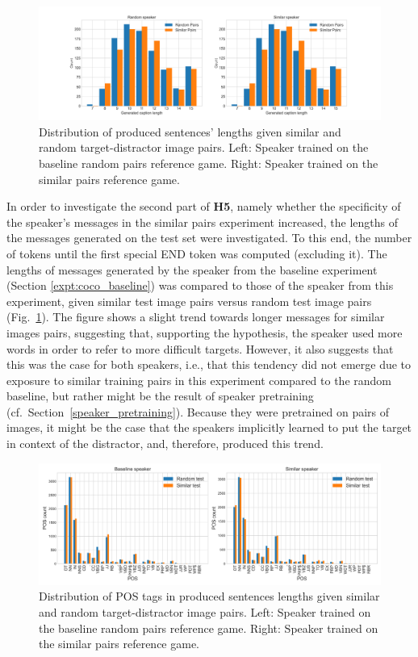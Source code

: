 \begin{figure}[h]
	\centering
	\includegraphics[width=\linewidth]{images/coco_random_similar_length_counts.png}
	\caption{Distribution of produced sentences' lengths given similar and random target-distractor image pairs. Left: Speaker trained on the baseline random pairs reference game. Right: Speaker trained on the similar pairs reference game.}
	\label{fig:coco_similar_random_speaker_lengths}
\end{figure}
In order to investigate the second part of \textbf{H5}, namely whether the specificity of the speaker's messages in the similar pairs experiment increased, the lengths of the messages generated on the test set were investigated. To this end, the number of tokens until the first special END token was computed (excluding it). The lengths of messages generated by the speaker from the baseline experiment (Section \ref{expt:coco_baseline}) was compared to those of the speaker from this experiment, given similar test image pairs versus random test image pairs (Fig.~\ref{fig:coco_similar_random_speaker_lengths}). The figure shows a slight trend towards longer messages for similar images pairs, suggesting that, supporting the hypothesis, the speaker used more words in order to refer to more difficult targets. However, it also suggests that this was the case for both speakers, i.e., that this tendency did not emerge due to exposure to similar training pairs in this experiment compared to the random baseline, but rather might be the result of speaker pretraining (cf.~Section~\ref{speaker_pretraining}). Because they were pretrained on pairs of images, it might be the case that the speakers implicitly learned to put the target in context of the distractor, and, therefore, produced this trend.
\begin{figure}[h]
	\centering
	\includegraphics[width=\linewidth]{images/coco_similar_v_baseline_randomTest_vs_similarTest_POS_counts.png}
	\caption{Distribution of POS tags in produced sentences lengths given similar and random target-distractor image pairs. Left: Speaker trained on the baseline random pairs reference game. Right: Speaker trained on the similar pairs reference game.}
	\label{fig:coco_similar_random_speaker_POS}
\end{figure}
